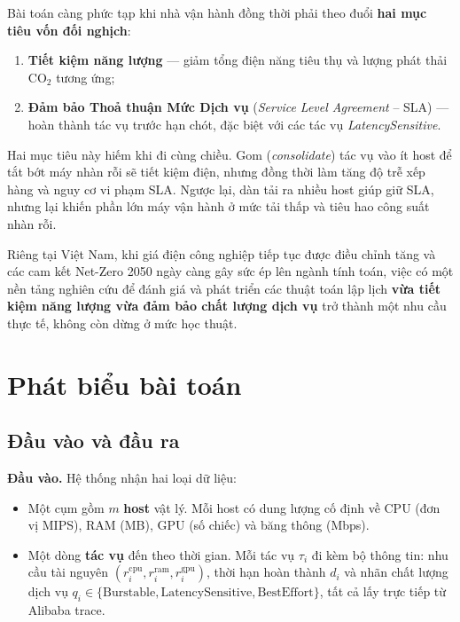 Bài toán càng phức tạp khi nhà vận hành đồng thời phải theo đuổi
\textbf{hai mục tiêu vốn đối nghịch}:
\begin{enumerate}
  \item \textbf{Tiết kiệm năng lượng} --- giảm tổng điện năng tiêu thụ và
        lượng phát thải $\mathrm{CO_2}$ tương ứng;
  \item \textbf{Đảm bảo Thoả thuận Mức Dịch vụ} (\textit{Service Level
        Agreement} -- SLA) --- hoàn thành tác vụ trước hạn chót, đặc biệt với
        các tác vụ \textit{LatencySensitive}.
\end{enumerate}
Hai mục tiêu này hiếm khi đi cùng chiều. Gom (\textit{consolidate}) tác vụ
vào ít host để tắt bớt máy nhàn rỗi sẽ tiết kiệm điện, nhưng đồng thời làm
tăng độ trễ xếp hàng và nguy cơ vi phạm SLA. Ngược lại, dàn tải ra nhiều host
giúp giữ SLA, nhưng lại khiến phần lớn máy vận hành ở mức tải thấp và tiêu
hao công suất nhàn rỗi.

Riêng tại Việt Nam, khi giá điện công nghiệp tiếp tục được điều chỉnh tăng và
các cam kết Net-Zero 2050 ngày càng gây sức ép lên ngành tính toán, việc có
một nền tảng nghiên cứu để đánh giá và phát triển các thuật toán lập lịch
\textbf{vừa tiết kiệm năng lượng vừa đảm bảo chất lượng dịch vụ} trở thành
một nhu cầu thực tế, không còn dừng ở mức học thuật.

\section{Phát biểu bài toán}
\label{sec:bai-toan}

\subsection{Đầu vào và đầu ra}

\textbf{Đầu vào.} Hệ thống nhận hai loại dữ liệu:
\begin{itemize}
  \item Một cụm gồm $m$ \textbf{host} vật lý. Mỗi host có dung lượng cố định
        về CPU (đơn vị MIPS), RAM (MB), GPU (số chiếc) và băng thông (Mbps).
  \item Một dòng \textbf{tác vụ} đến theo thời gian. Mỗi tác vụ $\tau_i$
        đi kèm bộ thông tin: nhu cầu tài nguyên $(r^{\mathrm{cpu}}_i,
        r^{\mathrm{ram}}_i, r^{\mathrm{gpu}}_i)$, thời hạn hoàn thành $d_i$
        và nhãn chất lượng dịch vụ $q_i \in \{\text{Burstable},
        \text{LatencySensitive}, \text{BestEffort}\}$, tất cả lấy trực tiếp
        từ Alibaba trace.
\end{itemize}

